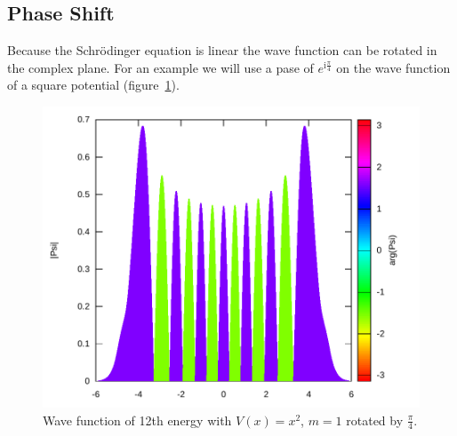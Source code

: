\documentclass[11pt,DIV=10,final]{scrreprt} %
\newcommand{\mi}{{\text{i}}}
\begin{document}
\subsection{Phase Shift}
Because the Schrödinger equation is linear the wave function can be rotated in the complex plane. For an example we will use a pase of $e^{\mi \frac{\pi}{4}}$ on the wave function of a square potential (figure~\ref{fig:square-12-pi4}).
\begin{figure}[H]
  \centering
  \includegraphics[width=\textwidth]{plots/square-12-pi4.pdf}
  \caption{\label{fig:square-12-pi4} Wave function of 12th energy with $V(x) = x^{2}$, $m = 1$ rotated by $\frac{\pi}{4}$.}
\end{figure}
\end{document}
